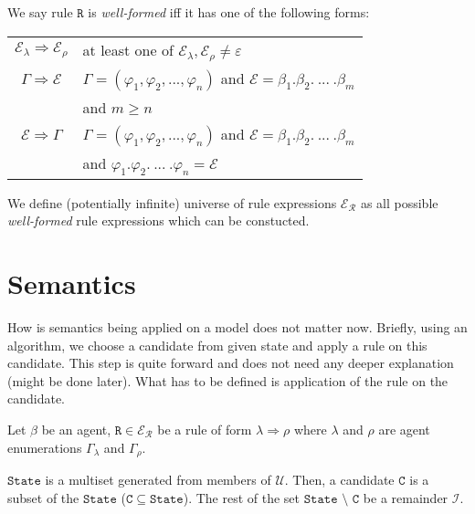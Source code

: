 \documentclass{entcs}
\renewcommand{\~}[0]{\texttildelow}
\begin{document}
\begin{defn}
We say rule $\mathtt{R}$ is \emph{well-formed} iff it has one of the following forms:
\begin{center}
\begin{tabular}{c@{\hskip 1in}l}
	$\mathcal{E}_\lambda \Rightarrow \mathcal{E}_\rho$ & at least one of $\mathcal{E}_\lambda, \mathcal{E}_\rho \neq \varepsilon $\\
	$\Gamma \Rightarrow \mathcal{E}$ & $\Gamma = (\varphi_1, \varphi_2, ..., \varphi_n) $ and $\mathcal{E} = \beta_1.\beta_2.~...~.\beta_m$ \\
	 & and $ m \geq n $\\
	$\mathcal{E} \Rightarrow \Gamma$ & $\Gamma = (\varphi_1, \varphi_2, ..., \varphi_n) $ and $\mathcal{E} = \beta_1.\beta_2.~...~.\beta_m$ \\
	 & and $ \varphi_1.\varphi_2.~...~.\varphi_n = \mathcal{E} $\\
\end{tabular}
\end{center}
\end{defn}

\begin{theorem}
We define (potentially infinite) universe of rule expressions $\mathcal{E}_\mathcal{R} $ as all possible \emph{well-formed} rule expressions which can be constucted.
\end{theorem}

\section{Semantics}

How is semantics being applied on a model does not matter now. Briefly, using an algorithm, we choose a candidate from given state and apply a rule on this candidate. This step is quite forward and does not need any deeper explanation (might be done later). What has to be defined is application of the rule on the candidate.

Let $\beta$ be an agent, $\mathtt{R} \in \mathcal{E}_\mathcal{R}$ be a rule of form $\lambda \Rightarrow \rho$ where $\lambda$ and $\rho$ are agent enumerations $\Gamma_\lambda$ and $\Gamma_\rho$.

\begin{defn}
$\mathtt{State}$ is a multiset generated from members of $\mathcal{U}$. Then, a candidate $\mathtt{C}$ is a subset of the $\mathtt{State}$ ($\mathtt{C} \subseteq \mathtt{State}$). The rest of the set $ \mathtt{State}$ $\setminus$ $\mathtt{C}$ be a remainder $\mathcal{I}$.
\end{defn}
\end{document}
